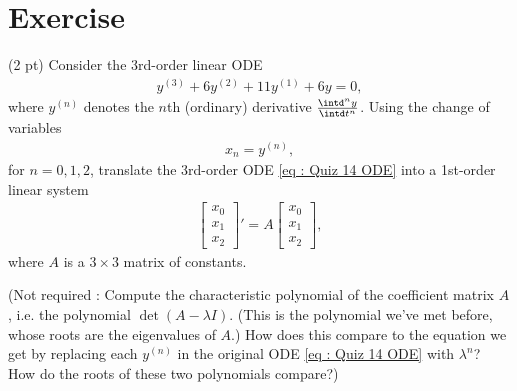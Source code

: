 %
%
\section{Exercise}

(2 pt) Consider the 3rd-order linear ODE
\begin{align}
y^{(3)} + 6 y^{(2)} + 11 y^{(1)} + 6 y
=
0,%
\label{eq : Quiz 14 ODE}
\end{align}
where $y^{(n)}$ denotes the $n$th (ordinary) derivative $\frac{\intd^{n} y}{\intd t^{n}}$. Using the change of variables
\begin{align*}
x_{n}
=
y^{(n)},
\end{align*}
for $n = 0,1,2$, translate the 3rd-order ODE \eqref{eq : Quiz 14 ODE} into a 1st-order linear system
\begin{align*}
\begin{bmatrix}
x_{0}	\\
x_{1}	\\
x_{2}
\end{bmatrix}
'
=
A
\begin{bmatrix}
x_{0}	\\
x_{1}	\\
x_{2}
\end{bmatrix}%
,
\end{align*}
where $A$ is a $3 \times 3$ matrix of constants. 

(Not required : Compute the characteristic polynomial of the coefficient matrix $A$, i.e. the polynomial $\det(A - \lambda I)$. (This is the polynomial we've met before, whose roots are the eigenvalues of $A$.) How does this compare to the equation we get by replacing each $y^{(n)}$ in the original ODE \eqref{eq : Quiz 14 ODE} with $\lambda^{n}$? How do the roots of these two polynomials compare?)

